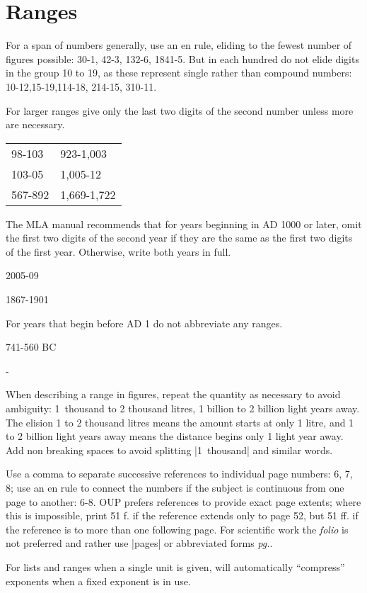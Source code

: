 \section{Ranges}

For a span of numbers generally, use an en rule, eliding to the fewest
number of figures possible: 30-1, 42-3, 132-6, 1841-5. But in each hundred
do not elide digits in the group 10 to 19, as these represent single
rather than compound numbers: 10-12,15-19,114-18, 214-15, 310-11.

For larger ranges give only the last two digits of the second number unless more are necessary.

\begin{longtable}{ll}
98-103    &923-1,003\\
103-05    &1,005-12\\
567-892   &1,669-1,722\\
\end{longtable}

The MLA manual \citep{MLA} recommends that for years beginning in AD 1000 or later, omit the first two digits of the second year if they are the same as the first two digits of the first year. Otherwise, write both years in full.

2005-09

1867-1901

For years that begin before AD 1 do not abbreviate any ranges.

741-560 BC

-


When describing a range in figures, repeat the quantity as necessary to
avoid ambiguity: 1~thousand to 2 thousand litres, 1 billion to 2 billion light years
away. The elision 1 to 2 thousand litres means the amount starts at only
1 litre, and 1 to 2 billion light years away means the distance begins only
1 light year away. Add non breaking spaces to avoid splitting |1~thousand| and similar words.


Use a comma to separate successive references to individual page
numbers: 6, 7, 8; use an en rule to connect the numbers if the subject
is continuous from one page to another: 6-8. OUP prefers references to
provide exact page extents; where this is impossible, print 51 f. if the
reference extends only to page 52, but 51 ff. if the reference is to more than one following page. For scientific work the \textit{folio} is not preferred and rather use |pages| or abbreviated forms \textit{pg.}. 


 For lists and ranges when a single unit is given,  will
 automatically \enquote{compress} exponents when a fixed exponent is in use.

